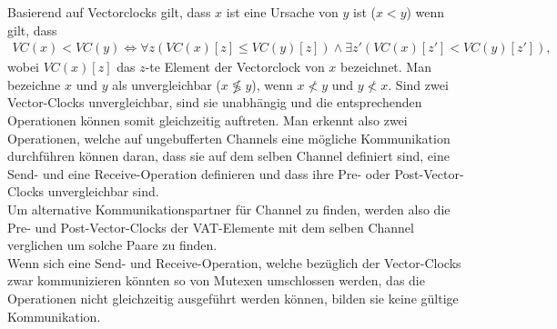 Basierend auf Vectorclocks gilt, dass $x$ ist eine Ursache von $y$ ist ($x < y$) wenn gilt, dass 
\begin{align}
  VC(x) < VC(y) \Leftrightarrow \forall z (VC(x)[z] \leq VC(y)[z]) \land \exists z' (VC(x)[{z'}] < VC(y)[{z'}]),
\end{align}
wobei $VC(x)[z]$ das $z$-te Element der Vectorclock von $x$ bezeichnet.
Man bezeichne $x$ und $y$ als unvergleichbar ($x \not\lessgtr y$), wenn 
$x \not< y $ und $y \not< x$.
Sind zwei Vector-Clocks 
unvergleichbar, sind sie unabhängig und die entsprechenden Operationen 
können somit gleichzeitig auftreten. 
Man erkennt also zwei Operationen, welche auf ungebufferten Channels eine mögliche Kommunikation durchführen 
können daran, dass sie auf dem selben Channel definiert sind, eine Send-
und eine Receive-Operation definieren und dass 
 ihre Pre- oder Post-Vector-Clocks unvergleichbar sind.\\
Um alternative Kommunikationspartner für Channel zu finden, werden also
die Pre- und Post-Vector-Clocks der VAT-Elemente mit dem selben Channel verglichen um
solche Paare zu finden.\\ Wenn sich eine Send- und Receive-Operation, 
welche bezüglich der Vector-Clocks zwar kommunizieren könnten so von Mutexen 
umschlossen werden, das die Operationen nicht gleichzeitig ausgeführt werden 
können, bilden sie keine gültige Kommunikation.


